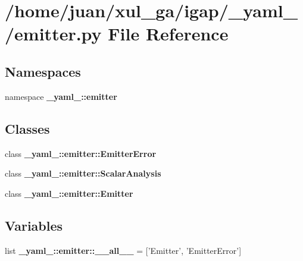 \section{/home/juan/xul\_\-ga/igap/\_\-yaml\_\-/emitter.py File Reference}
\label{emitter_8py}
\subsection*{Namespaces}
\begin{CompactItemize}
\item 
namespace {\bf \_\-yaml\_\-::emitter}
\end{CompactItemize}
\subsection*{Classes}
\begin{CompactItemize}
\item 
class {\bf \_\-yaml\_\-::emitter::EmitterError}
\item 
class {\bf \_\-yaml\_\-::emitter::ScalarAnalysis}
\item 
class {\bf \_\-yaml\_\-::emitter::Emitter}
\end{CompactItemize}
\subsection*{Variables}
\begin{CompactItemize}
\item 
list {\bf \_\-yaml\_\-::emitter::\_\-\_\-all\_\-\_\-} = ['Emitter', 'EmitterError']
\end{CompactItemize}
